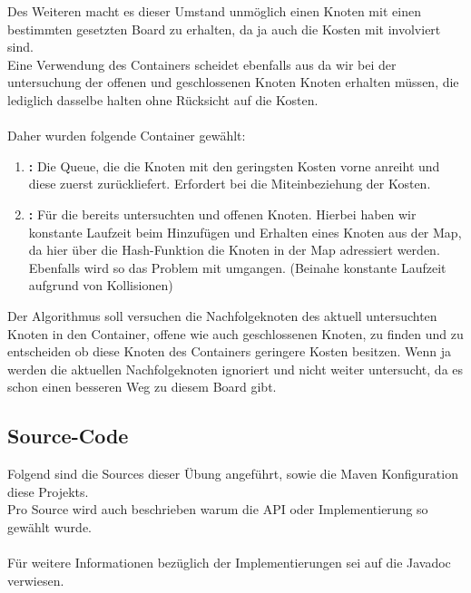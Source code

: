 \documentclass[11pt, a4paper, twoside]{article}   	%
\newcommand{\sourceSection}{Source-Code}
\begin{document}
Des Weiteren macht es dieser Umstand unmöglich einen Knoten mit einen bestimmten gesetzten Board zu erhalten, da ja auch die Kosten mit involviert sind.\\
Eine Verwendung des Containers  scheidet ebenfalls aus da wir bei der untersuchung der offenen und geschlossenen Knoten Knoten erhalten müssen, die lediglich dasselbe  halten ohne Rücksicht auf die Kosten. \\\\
Daher wurden folgende Container gewählt:\
\begin{enumerate}
	\item \textbf{:} Die Queue, die die Knoten mit den geringsten Kosten vorne anreiht und diese zuerst zurückliefert. Erfordert bei  die Miteinbeziehung der Kosten.
	\item \textbf{\inlineJavaSource{HashMap<Board<T>, SearchNode<T>>}: } Für die bereits untersuchten und offenen Knoten. Hierbei haben wir konstante Laufzeit beim Hinzufügen und Erhalten eines Knoten aus der Map, da hier über die Hash-Funktion  die Knoten in der Map adressiert werden. Ebenfalls wird so das Problem mit  umgangen. (Beinahe konstante Laufzeit aufgrund von Kollisionen) 
\end{enumerate}
Der Algorithmus soll versuchen die Nachfolgeknoten des aktuell untersuchten Knoten in den Container, offene wie auch geschlossenen Knoten, zu finden und zu entscheiden ob diese Knoten des Containers geringere Kosten besitzen. Wenn ja werden die aktuellen Nachfolgeknoten ignoriert und nicht weiter untersucht, da es schon einen besseren Weg zu diesem Board gibt.

\newpage
\subsection{\sourceSection}
Folgend sind die Sources dieser Übung angeführt, sowie die Maven Konfiguration diese Projekts.\\
Pro Source wird auch beschrieben warum die API oder Implementierung so gewählt wurde.\\\\
Für weitere Informationen bezüglich der Implementierungen sei auf die Javadoc verwiesen.
\end{document}
